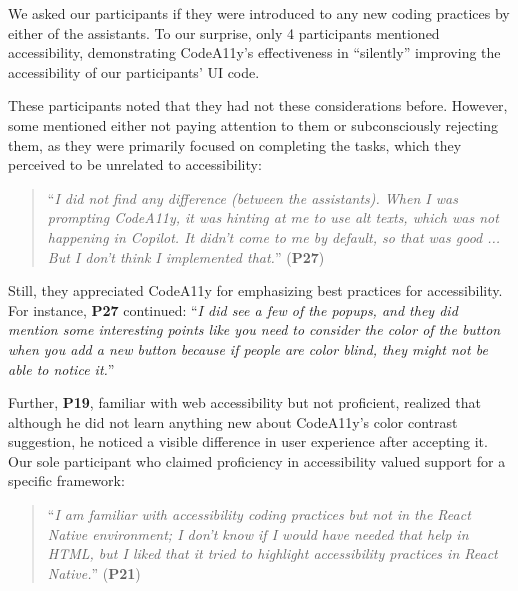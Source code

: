 \begin{highlight} We asked our participants if they were introduced to any new coding practices by either of the assistants. To our surprise, only 4 participants mentioned accessibility, demonstrating CodeA11y's effectiveness in ``silently'' improving the accessibility of our participants' UI code. \end{highlight} These participants noted that they had not these considerations before. However, some mentioned either not paying attention to them or subconsciously rejecting them, as they were primarily focused on completing the tasks, which they perceived to be unrelated to accessibility:
\begin{quote}
    ``\textit{I did not find any difference (between the assistants). When I was prompting CodeA11y, it was hinting at me to use alt texts, which was not happening in Copilot. It didn’t come to me by default, so that was good ... But I don't think I implemented that.}'' (\textbf{P27})
\end{quote}

Still, they appreciated CodeA11y for emphasizing best practices for accessibility. For instance, \textbf{P27} continued: ``\textit{I did see a few of the popups, and they did mention some interesting points like you need to consider the color of the button when you add a new button because if people are color blind, they might not be able to notice it.}'' \begin{highlight} Further, \textbf{P19}, familiar with web accessibility but not proficient, realized that although he did not learn anything new about CodeA11y's color contrast suggestion, he noticed a visible difference in user experience after accepting it. Our sole participant who claimed proficiency in accessibility valued support for a specific framework:\end{highlight}
\begin{quote}
    ``\textit{I am familiar with accessibility coding practices but not in the React Native environment; I don't know if I would have needed that help in HTML, but I liked that it tried to highlight accessibility practices in React Native.}'' (\textbf{P21})
\end{quote}

